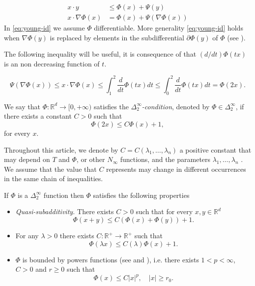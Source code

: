 \documentclass[twoside]{article}
\theoremstyle{remark}
\newcommand{\rr}{\mathbb{R}}
\renewcommand{\leq}{\leqslant}
\renewcommand{\geq}{\geqslant}
\begin{document}
\begin{align}
  x\cdot y&\leq \Phi(x)+\Psi(y)\tag{Fenchel's Inequality}\label{eq:young-ine}\\
  x\cdot \nabla\Phi(x)&= \Phi(x)+\Psi(\nabla \Phi (x))\tag{Fenchel's Identity}\label{eq:young-id}
\end{align}
In \eqref{eq:young-id} we assume $\Phi$ differentiable. More generality \eqref{eq:young-id} holds when $\nabla \Phi (y)$ is replaced by elements in the subdifferential $\partial\Phi(y)$ of $\Phi$ (see \cite[Ex. 4.27]{clarke2013functional}).

The following inequality  will be useful, it is consequence of that $(d/dt)\Phi(tx)$ is an non decreasing function of $t$. 


\begin{equation}\label{eq:ine-psi-phi'}\Psi(\nabla \Phi (x))\leq  x\cdot \nabla\Phi(x) \leq\int_1^2 \frac{d}{dt}\Phi(tx)dt \leq\int_0^2\frac{d}{dt}\Phi(tx)dt=\Phi(2x).
\end{equation}

We say that  $\Phi:\mathbb{R}^d\rightarrow [0,+\infty)$ satisfies the  \emph{$\Delta_2^{\infty}$-condition}, denoted by $\Phi \in \Delta_2^{\infty}$,
if there exists a  constant $C>0$  such that
\begin{equation}\label{delta2defi}\Phi(2x)\leq C \Phi(x)+1,
\end{equation}
for every $x$.  

Throughout this article, we denote by $C=C(\lambda_1,\ldots,\lambda_n)$ a positive constant that may depend on $T$ and $\Phi$,  or other $N_{\infty}$ functions, and the parameters $\lambda_1,\ldots,\lambda_n$ . We assume that the value that $C$ represents may change in 
different occurrences in the same chain of inequalities. 




If $\Phi$ is a $\Delta_2^{\infty}$ function then $\Phi$ satisfies the following properties



\begin{itemize}
 \item \emph{Quasi-subadditivity.} There exists $C>0$ such that for every $x,y\in \rr^d$
\begin{equation}\label{eq:quasi-sub-aditividad}
\Phi(x+y)\leq C (\Phi(x)+\Phi(y))+1.
\end{equation}
\item  For any $\lambda>0$ there exists $C:\rr^+\to \rr^+$ such that
\begin{equation}\label{eq:delta2-lambda}
\Phi(\lambda x)\leq C(\lambda)\Phi(x)+1.
\end{equation}
\item $\Phi$ is bounded by powers functions (see \cite[Proof Lemma 2.4]{Desch2001} and \cite[Prop. 1]{cianchi2000local}), i.e. there exists $1<p<\infty$, $C>0$ and $r\geq 0$ such that
\[\Phi(x)\leq C|x|^p,\quad |x|\geq r_0.\]

\end{itemize}
\end{document}
